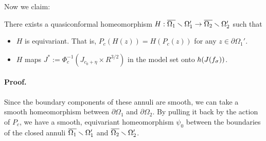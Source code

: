 Now we claim:
\begin{lem}
\label{lem_B-0}
There exists a quasiconformal homeomorphism 
$H:\overline{\Omega_1} \smallsetminus {\Omega_1'} \to \overline{\Omega_2} \smallsetminus {\Omega_2'}$
such that
\begin{itemize}
\item
$H$ is equivariant. That is, 
$P_{c}(H(z))=H(P_{c}(z))$ for any  $z \in \partial \Omega_1'$.
\item
$H$ maps 
$J^\ast:=\Phi_{c}^{-1}(J_{c_0 + \eta}\times R^{3/2})$ in the model set onto $h(J(f_{\sigma}))$.
\end{itemize}
\end{lem}

\paragraph{\bf Proof.}
Since the boundary components of these annuli are smooth,
we can take a smooth homeomorphism between $\partial \Omega_1$
and $\partial \Omega_2$.
By pulling it back by the action of $P_{c}$,
we have a smooth, equivariant homeomorphism $\psi_0$ between the
boundaries of the closed annuli $\overline{\Omega_1} \smallsetminus {\Omega_1'}$
and $\overline{\Omega_2} \smallsetminus {\Omega_2'}$.

